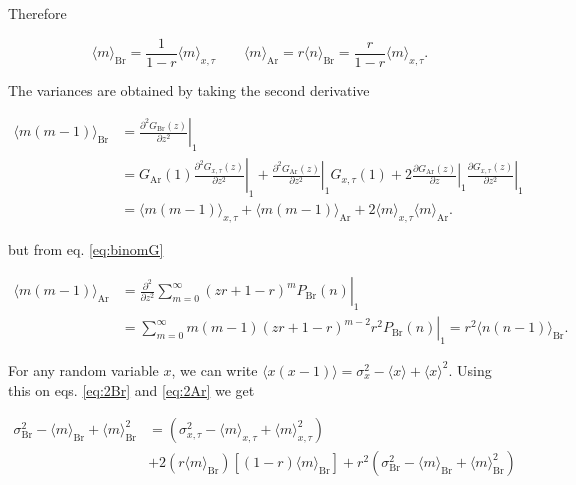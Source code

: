 Therefore

\begin{equation}
  \label{eq:aveBrAr}
  \langle m\rangle_\text{Br} = \frac{1}{1-r}\langle m\rangle_{x,\tau}\quad\quad \langle m\rangle_\text{Ar} = r\langle n\rangle_\text{Br} = \frac{r}{1-r}\langle m\rangle_{x,\tau}.
\end{equation}

The variances are obtained by taking the second derivative

\begin{equation}
  \label{eq:2Br}
  \begin{split}
    \langle m(m-1)\rangle_\text{Br} &= \left.\frac{\partial^2 G_\text{Br}(z)}{\partial z^2}\right|_1\\
    &=G_\text{Ar}(1)\left.\frac{\partial^2 G_{x,\tau}(z)}{\partial z^2}\right|_1 + \left.\frac{\partial^2 G_\text{Ar}(z)}{\partial z^2}\right|_1G_{x,\tau}(1) + 2\left.\frac{\partial G_\text{Ar}(z)}{\partial z}\right|_1\left.\frac{\partial G_{x,\tau}(z)}{\partial z^2}\right|_1\\
    &=\langle m(m-1)\rangle_{x,\tau}+\langle m(m-1)\rangle_\text{Ar}+2\langle m\rangle_{x,\tau}\langle m\rangle_\text{Ar}.
  \end{split}
\end{equation}

but from eq. \ref{eq:binomG}

\begin{equation}
  \label{eq:2Ar}
  \begin{split}
    \langle m(m-1)\rangle_\text{Ar} &= \left.\frac{\partial^2}{\partial z^2}\sum_{m=0}^\infty(zr+1-r)^mP_\text{Br}(n)\right|_1\\
    &= \left.\sum_{m=0}^\infty m(m-1)(zr+1-r)^{m-2}r^2P_\text{Br}(n)\right|_1 = r^2\langle n(n-1)\rangle_\text{Br}.
  \end{split}
\end{equation}

For any random variable $x$, we can write $\langle x(x-1)\rangle = \sigma_x^2 - \langle x\rangle + \langle x\rangle^2$. Using this on eqs. \ref{eq:2Br} and \ref{eq:2Ar} we get


\begin{equation*}
  \begin{split}
  \sigma^2_\text{Br}- \langle m\rangle_\text{Br} + \langle m\rangle^2_\text{Br} &= \left( \sigma^2_{x,\tau} - \langle m\rangle_{x,\tau} + \langle m\rangle_{x,\tau}^2\right)\\
&+ 2\left(r\langle m\rangle_\text{Br}\right)\left[(1-r)\langle m\rangle_\text{Br}\right]+r^2\left(\sigma^2_\text{Br}- \langle m\rangle_\text{Br} + \langle m\rangle^2_\text{Br}\right)
  \end{split}
\end{equation*}

